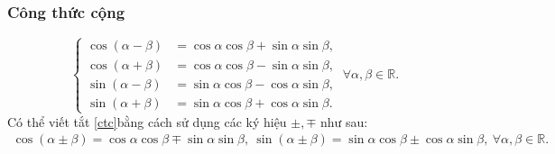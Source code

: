 \documentclass[oneside]{book}
\numberwithin{equation}{section}
\begin{document}
\subsubsection{Công thức cộng}
\begin{equation}
	\label{ctc}
	\tag{ctc}
	\boxed{\left\{\begin{split}
		\cos(\alpha - \beta) &= \cos\alpha\cos\beta + \sin\alpha\sin\beta,\\
		\cos(\alpha + \beta) &= \cos\alpha\cos\beta - \sin\alpha\sin\beta,\\
		\sin(\alpha - \beta) &= \sin\alpha\cos\beta - \cos\alpha\sin\beta,\\
		\sin(\alpha + \beta) &= \sin\alpha\cos\beta + \cos\alpha\sin\beta.
	\end{split}\right.\ \forall\alpha,\beta\in\mathbb{R}.}
\end{equation}
Có thể viết tắt \eqref{ctc}bằng cách sử dụng các ký hiệu $\pm,\mp$ như sau:
\begin{align*}
	\boxed{\cos(\alpha\pm\beta) = \cos\alpha\cos\beta \mp \sin\alpha\sin\beta,\ \sin(\alpha\pm\beta) = \sin\alpha\cos\beta\pm\cos\alpha\sin\beta,\ \forall\alpha,\beta\in\mathbb{R}.}
\end{align*}
\end{document}
